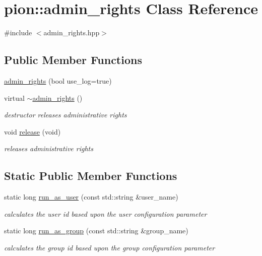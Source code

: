 \hypertarget{classpion_1_1admin__rights}{\section{pion\-:\-:admin\-\_\-rights Class Reference}
\label{classpion_1_1admin__rights}
}


{\ttfamily \#include $<$admin\-\_\-rights.\-hpp$>$}

\subsection*{Public Member Functions}
\begin{DoxyCompactItemize}
\item 
\hyperlink{classpion_1_1admin__rights_abfb9f3aea1e085f4a5a666a98fa36c7c}{admin\-\_\-rights} (bool use\-\_\-log=true)
\item 
virtual \hyperlink{classpion_1_1admin__rights_a3dd9a6d85bdeffe1243a25b78e562716}{$\sim$admin\-\_\-rights} ()
\begin{DoxyCompactList}\small\item\em destructor releases administrative rights \end{DoxyCompactList}\item 
void \hyperlink{classpion_1_1admin__rights_a2979c3b20e89e29113a9593d14a563b8}{release} (void)
\begin{DoxyCompactList}\small\item\em releases administrative rights \end{DoxyCompactList}\end{DoxyCompactItemize}
\subsection*{Static Public Member Functions}
\begin{DoxyCompactItemize}
\item 
static long \hyperlink{classpion_1_1admin__rights_ab8ebba2984ee6610829fbac64c149f06}{run\-\_\-as\-\_\-user} (const std\-::string \&user\-\_\-name)
\begin{DoxyCompactList}\small\item\em calculates the user id based upon the user configuration parameter \end{DoxyCompactList}\item 
static long \hyperlink{classpion_1_1admin__rights_ae2b1e96be191af3cf81851cdf2c69e2a}{run\-\_\-as\-\_\-group} (const std\-::string \&group\-\_\-name)
\begin{DoxyCompactList}\small\item\em calculates the group id based upon the group configuration parameter \end{DoxyCompactList}\end{DoxyCompactItemize}


